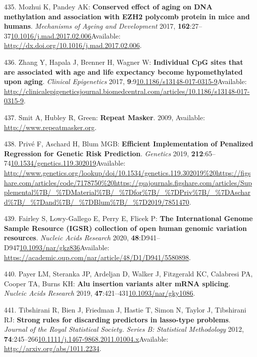 \documentclass[
]{book}
\begin{document}
\leavevmode\hypertarget{ref-Mozhui2017}{}%
435. Mozhui K, Pandey AK: \textbf{Conserved effect of aging on DNA methylation and association with EZH2 polycomb protein in mice and humans}. \emph{Mechanisms of Ageing and Development} 2017, \textbf{162}:27--37\href{https://doi.org/10.1016/j.mad.2017.02.006}{10.1016/j.mad.2017.02.006}Available: \url{http://dx.doi.org/10.1016/j.mad.2017.02.006}.

\leavevmode\hypertarget{ref-Zhang2017}{}%
436. Zhang Y, Hapala J, Brenner H, Wagner W: \textbf{Individual CpG sites that are associated with age and life expectancy become hypomethylated upon aging}. \emph{Clinical Epigenetics} 2017, \textbf{9}:9\href{https://doi.org/10.1186/s13148-017-0315-9}{10.1186/s13148-017-0315-9}Available: \url{http://clinicalepigeneticsjournal.biomedcentral.com/articles/10.1186/s13148-017-0315-9}.

\leavevmode\hypertarget{ref-Smit2009}{}%
437. Smit A, Hubley R, Green: \textbf{Repeat Masker}. 2009, Available: \url{http://www.repeatmasker.org}.

\leavevmode\hypertarget{ref-Prive2019}{}%
438. Privé F, Aschard H, Blum MGB: \textbf{Efficient Implementation of Penalized Regression for Genetic Risk Prediction}. \emph{Genetics} 2019, \textbf{212}:65--74\href{https://doi.org/10.1534/genetics.119.302019}{10.1534/genetics.119.302019}Available: \url{http://www.genetics.org/lookup/doi/10.1534/genetics.119.302019\%20https://figshare.com/articles/code/7178750\%20https://gsajournals.figshare.com/articles/Supplemental\%7B/_\%7DMaterial\%7B/_\%7Dfor\%7B/_\%7DPriv\%7B/_\%7DAschard\%7B/_\%7Dand\%7B/_\%7DBlum\%7B/_\%7D2019/7851470}.

\leavevmode\hypertarget{ref-Fairley2020}{}%
439. Fairley S, Lowy-Gallego E, Perry E, Flicek P: \textbf{The International Genome Sample Resource (IGSR) collection of open human genomic variation resources}. \emph{Nucleic Acids Research} 2020, \textbf{48}:D941--D947\href{https://doi.org/10.1093/nar/gkz836}{10.1093/nar/gkz836}Available: \url{https://academic.oup.com/nar/article/48/D1/D941/5580898}.

\leavevmode\hypertarget{ref-Payer2019}{}%
440. Payer LM, Steranka JP, Ardeljan D, Walker J, Fitzgerald KC, Calabresi PA, Cooper TA, Burns KH: \textbf{Alu insertion variants alter mRNA splicing}. \emph{Nucleic Acids Research} 2019, \textbf{47}:421--431\href{https://doi.org/10.1093/nar/gky1086}{10.1093/nar/gky1086}.

\leavevmode\hypertarget{ref-Tibshirani2012}{}%
441. Tibshirani R, Bien J, Friedman J, Hastie T, Simon N, Taylor J, Tibshirani RJ: \textbf{Strong rules for discarding predictors in lasso-type problems}. \emph{Journal of the Royal Statistical Society. Series B: Statistical Methodology} 2012, \textbf{74}:245--266\href{https://doi.org/10.1111/j.1467-9868.2011.01004.x}{10.1111/j.1467-9868.2011.01004.x}Available: \url{http://arxiv.org/abs/1011.2234}.
\end{document}
